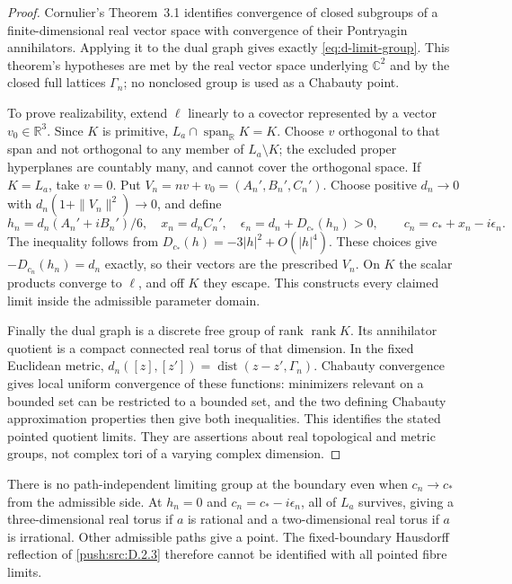 \begin{proof}
Cornulier's Theorem~3.1 identifies convergence of closed subgroups of
a finite-dimensional real vector space with convergence of their
Pontryagin annihilators. Applying it to the dual graph gives exactly
\eqref{eq:d-limit-group}. This theorem's hypotheses are met by the
real vector space underlying \(\mathbb C^2\) and by the closed full
lattices \(\Gamma_n\); no nonclosed group is used as a Chabauty
point.

To prove realizability, extend \(\ell\) linearly to a covector
represented by a vector \(v_0\in\mathbb R^3\). Since \(K\) is
primitive, \(L_a\cap\operatorname{span}_{\mathbb R}K=K\).
Choose \(v\) orthogonal to that span and not orthogonal to any member
of \(L_a\setminus K\); the excluded proper hyperplanes are
countably many, and cannot cover the orthogonal space. If
\(K=L_a\), take \(v=0\). Put \(V_n=nv+v_0=(A_n',B_n',C_n')\).
Choose positive \(d_n\to0\) with
\(d_n(1+\|V_n\|^2)\to0\), and define
\[
 h_n=d_n(A_n'+iB_n')/6,\quad x_n=d_nC_n',\quad
 \epsilon_n=d_n+D_{c_*}(h_n)>0,
 \qquad c_n=c_*+x_n-i\epsilon_n.
\]
The inequality follows from \(D_{c_*}(h)=-3|h|^2+O(|h|^4)\).
These choices give \(-D_{c_n}(h_n)=d_n\) exactly, so their vectors
are the prescribed \(V_n\). On \(K\) the scalar products converge
to \(\ell\), and off \(K\) they escape. This constructs every
claimed limit inside the admissible parameter domain.

Finally the dual graph is a discrete free group of rank
\(\operatorname{rank}K\). Its annihilator quotient is a compact
connected real torus of that dimension. In the fixed Euclidean metric,
\(d_n([z],[z'])=\operatorname{dist}(z-z',\Gamma_n)\).
Chabauty convergence gives local uniform convergence of these
functions: minimizers relevant on a bounded set can be restricted to
a bounded set, and the two defining Chabauty approximation properties
then give both inequalities. This identifies the stated pointed
quotient limits. They are assertions about real topological and
metric groups, not complex tori of a varying complex dimension.
\end{proof}

\begin{corollary}\label{push:src:D.3.2}
There is no path-independent limiting group at the boundary even
when \(c_n\to c_*\) from the admissible side. At \(h_n=0\) and
\(c_n=c_*-i\epsilon_n\), all of \(L_a\) survives, giving a
three-dimensional real torus if \(a\) is rational and a
two-dimensional real torus if \(a\) is irrational. Other admissible
paths give a point. The fixed-boundary Hausdorff reflection of \ref{push:src:D.2.3}
therefore cannot be identified with all pointed fibre limits.
\end{corollary}

